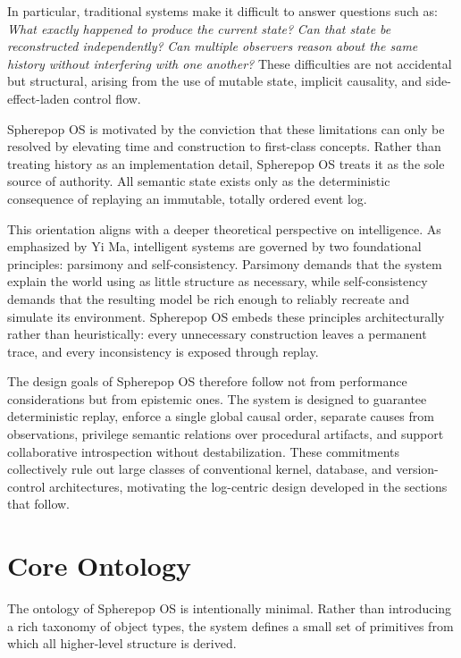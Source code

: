 \documentclass[11pt]{article}
\begin{document}
In particular, traditional systems make it difficult to answer questions
such as: \emph{What exactly happened to produce the current state?} \emph{Can
that state be reconstructed independently?} \emph{Can multiple observers
reason about the same history without interfering with one another?} These
difficulties are not accidental but structural, arising from the use of
mutable state, implicit causality, and side-effect-laden control flow.

Spherepop OS is motivated by the conviction that these limitations can only
be resolved by elevating time and construction to first-class concepts.
Rather than treating history as an implementation detail, Spherepop OS
treats it as the sole source of authority. All semantic state exists only as
the deterministic consequence of replaying an immutable, totally ordered
event log.

This orientation aligns with a deeper theoretical perspective on
intelligence. As emphasized by Yi Ma, intelligent systems are governed by
two foundational principles: parsimony and self-consistency. Parsimony
demands that the system explain the world using as little structure as
necessary, while self-consistency demands that the resulting model be rich
enough to reliably recreate and simulate its environment. Spherepop OS
embeds these principles architecturally rather than heuristically: every
unnecessary construction leaves a permanent trace, and every inconsistency
is exposed through replay.

The design goals of Spherepop OS therefore follow not from performance
considerations but from epistemic ones. The system is designed to guarantee
deterministic replay, enforce a single global causal order, separate causes
from observations, privilege semantic relations over procedural artifacts,
and support collaborative introspection without destabilization. These
commitments collectively rule out large classes of conventional kernel,
database, and version-control architectures, motivating the log-centric
design developed in the sections that follow.

\section{Core Ontology}

The ontology of Spherepop OS is intentionally minimal. Rather than
introducing a rich taxonomy of object types, the system defines a small set
of primitives from which all higher-level structure is derived.
\end{document}
